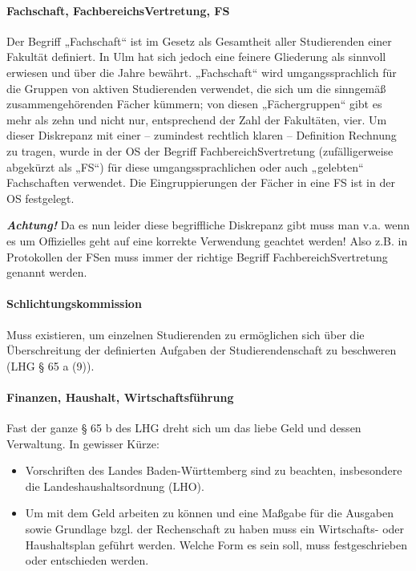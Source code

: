 \documentclass[
10pt,
a4paper,
twoside,								%
titlepage=false,							%
draft=false								%
]{scrartcl}
\begin{document}
\paragraph{Fachschaft, FachbereichsVertretung, FS}

Der Begriff „Fachschaft“ ist im Gesetz als Gesamtheit aller Studierenden einer Fakultät definiert. In Ulm hat sich jedoch eine feinere Gliederung als sinnvoll erwiesen und über die Jahre bewährt. „Fachschaft“ wird umgangssprachlich für die Gruppen von aktiven Studierenden verwendet, die sich um die sinngemäß zusammengehörenden Fächer kümmern; von diesen „Fächergruppen“ gibt es mehr als zehn und nicht nur, entsprechend der Zahl der Fakultäten, vier. Um dieser Diskrepanz mit einer – zumindest rechtlich klaren – Definition Rechnung zu tragen, wurde in der OS der Begriff FachbereichSvertretung (zufälligerweise abgekürzt als „FS“) für diese umgangssprachlichen oder auch „gelebten“ Fachschaften verwendet. Die Eingruppierungen der Fächer in eine FS ist in der OS festgelegt.

\textbf{\emph{Achtung!}} Da es nun leider diese begriffliche Diskrepanz gibt muss man v.a. wenn es um Offizielles geht auf eine korrekte Verwendung geachtet werden! Also z.B. in Protokollen der FSen muss immer der richtige Begriff FachbereichSvertretung genannt werden.


\paragraph{Schlichtungskommission}

Muss existieren, um einzelnen Studierenden zu ermöglichen sich über die Überschreitung der definierten Aufgaben der Studierendenschaft zu beschweren (LHG § 65 a (9)).


\paragraph{Finanzen, Haushalt, Wirtschaftsführung\label{Glossar:Finanzen, Haushalt, Wirtschaftsführung}}

Fast der ganze § 65 b des LHG dreht sich um das liebe Geld und dessen Verwaltung. In gewisser Kürze:
\begin{itemize}
	\item Vorschriften des Landes Baden-Württemberg sind zu beachten, insbesondere die Landeshaushaltsordnung (LHO).
	\item Um mit dem Geld arbeiten zu können und eine Maßgabe für die Ausgaben sowie Grundlage bzgl. der Rechenschaft zu haben muss ein Wirtschafts- oder Haushaltsplan geführt werden. Welche Form es sein soll, muss festgeschrieben oder entschieden werden.
\end{itemize}
\end{document}
